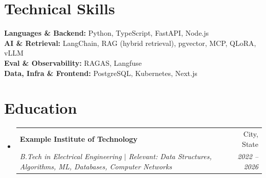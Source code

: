 \documentclass[letterpaper,11pt]{article}
\makeatletter
\newcommand{\resumeSubheading}[4]{
  \vspace{-2pt}\item
  \begin{tabular*}{0.97\textwidth}[t]{l@{\extracolsep{\fill}}r}
    \textbf{#1} & #2 \\
    \textit{\small #3} & \textit{\small #4} \\
  \end{tabular*}\vspace{-6pt}
}
\newcommand{\resumeSubHeadingListStart}{\begin{itemize}[leftmargin=0.15in, label={}]}
\newcommand{\resumeSubHeadingListEnd}{\end{itemize}}
\makeatother
\begin{document}
\section{Technical Skills}
\begin{itemize}[leftmargin=0.15in, label={}]
\small{\item{

\textbf{Languages \& Backend:} Python, TypeScript, FastAPI, Node.js \\

\textbf{AI \& Retrieval:} LangChain, RAG (hybrid retrieval), pgvector, MCP, QLoRA, vLLM \\

\textbf{Eval \& Observability:} RAGAS, Langfuse \\

\textbf{Data, Infra \& Frontend:} PostgreSQL, Kubernetes, Next.js

}}
\end{itemize}

\section{Education}
\resumeSubHeadingListStart
\resumeSubheading
{Example Institute of Technology}{City, State}
{B.Tech in Electrical Engineering $|$ \small{Relevant: Data Structures, Algorithms, ML, Databases, Computer Networks}}{2022 -- 2026}
\resumeSubHeadingListEnd
\end{document}
